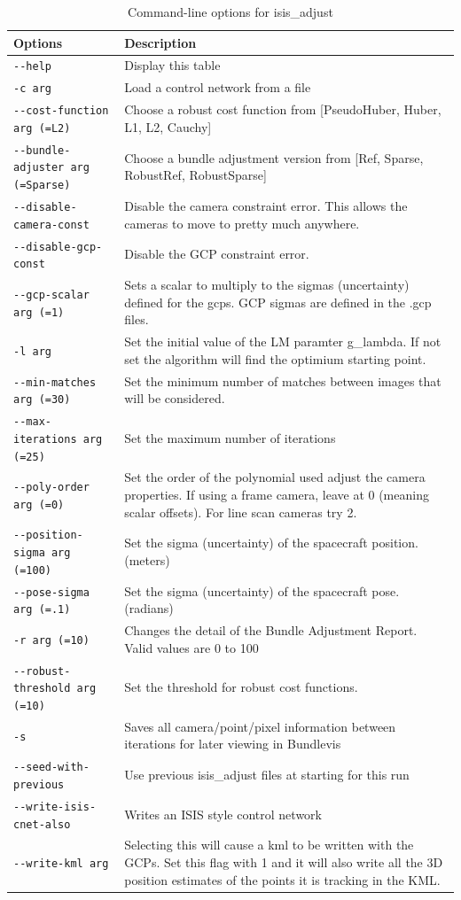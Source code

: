 \begin{longtable}{|l|p{10cm}|}
\caption{Command-line options for isis\_adjust}
\label{tbl:isise_adjust}
\endfirsthead
\endhead
\endfoot
\endlastfoot
\hline
Options & Description \\ \hline \hline
\verb#--help# & Display this table \\ \hline
\verb#-c arg# & Load a control network from a file \\ \hline
\verb#--cost-function arg (=L2)# & Choose a robust cost function from [PseudoHuber, Huber, L1, L2, Cauchy] \\ \hline
\verb#--bundle-adjuster arg (=Sparse)# & Choose a bundle adjustment version from [Ref, Sparse, RobustRef, RobustSparse] \\ \hline
\verb#--disable-camera-const# & Disable the camera constraint error. This allows the cameras to move to pretty much anywhere. \\ \hline
\verb#--disable-gcp-const# & Disable the GCP constraint error. \\ \hline
\verb#--gcp-scalar arg (=1)# & Sets a scalar to multiply to the sigmas (uncertainty) defined for the gcps. GCP sigmas are defined in the .gcp files. \\ \hline
\verb#-l arg# & Set the initial value of the LM paramter g\_lambda. If not set the algorithm will find the optimium starting point. \\ \hline
\verb#--min-matches arg (=30)# & Set the minimum number of matches between images that will be considered. \\ \hline
\verb#--max-iterations arg (=25)# & Set the maximum number of iterations \\ \hline
\verb#--poly-order arg (=0)# & Set the order of the polynomial used adjust the camera properties. If using a frame camera, leave at 0 (meaning scalar offsets). For line scan cameras try 2. \\ \hline
\verb#--position-sigma arg (=100)# & Set the sigma (uncertainty) of the spacecraft position. (meters) \\ \hline
\verb#--pose-sigma arg (=.1)# & Set the sigma (uncertainty) of the spacecraft pose. (radians) \\ \hline
\verb#-r arg (=10)# & Changes the detail of the Bundle Adjustment Report. Valid values are 0 to 100 \\ \hline
\verb#--robust-threshold arg (=10)# & Set the threshold for robust cost functions. \\ \hline
\verb#-s# & Saves all camera/point/pixel information between iterations for later viewing in Bundlevis \\ \hline
\verb#--seed-with-previous# & Use previous isis\_adjust files at starting for this run \\ \hline
\verb#--write-isis-cnet-also# & Writes an ISIS style control network \\ \hline
\verb#--write-kml arg# & Selecting this will cause a kml to be written with the GCPs. Set this flag with 1 and it will also write all the 3D position estimates of the points it is tracking in the KML. \\ \hline
\end{longtable}

